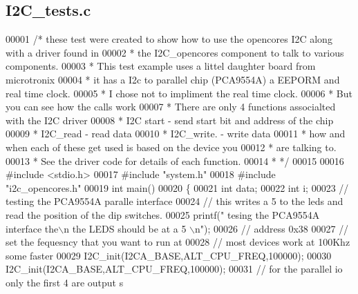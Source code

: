 \subsection{I2\+C\+\_\+tests.\+c}
\label{I2C__tests_8c_source}

\begin{DoxyCode}
00001 \textcolor{comment}{/* these test were created to show how to use the opencores I2C along with a driver found in}
00002 \textcolor{comment}{ * the I2C\_opencores component to talk to various components. }
00003 \textcolor{comment}{ * This test example uses a littel daughter board from microtronix}
00004 \textcolor{comment}{ * it has a I2c to parallel chip (PCA9554A) a EEPORM and real time clock. }
00005 \textcolor{comment}{ * I chose not to impliment the real time clock. }
00006 \textcolor{comment}{ * But you can see how the calls work}
00007 \textcolor{comment}{ * There are only 4 functions associalted with the I2C driver}
00008 \textcolor{comment}{ * I2C start  -  send start bit and address of the chip}
00009 \textcolor{comment}{ * I2C\_read - read data}
00010 \textcolor{comment}{ * I2C\_write. - write data}
00011 \textcolor{comment}{ * how and when each of these get used is based on the device you}
00012 \textcolor{comment}{ * are talking to. }
00013 \textcolor{comment}{ * See the driver code for details of each function. }
00014 \textcolor{comment}{ * */}
00015 
00016 \textcolor{preprocessor}{#include <stdio.h>}
00017 \textcolor{preprocessor}{#include "system.h"}
00018 \textcolor{preprocessor}{#include "i2c\_opencores.h"}
00019 \textcolor{keywordtype}{int} main()
00020 \{
00021     \textcolor{keywordtype}{int} data;
00022     \textcolor{keywordtype}{int} i;
00023     \textcolor{comment}{// testing the PCA9554A paralle interface}
00024     \textcolor{comment}{// this writes a 5 to the leds and read the position of the dip switches.}
00025  printf(\textcolor{stringliteral}{" tesing the PCA9554A interface the\(\backslash\)n the LEDS should be at a 5 \(\backslash\)n"});  
00026  \textcolor{comment}{// address 0x38 }
00027  \textcolor{comment}{// set the fequesncy that you want to run at }
00028  \textcolor{comment}{// most devices work at 100Khz  some faster}
00029  I2C_init(I2CA\_BASE,ALT_CPU_FREQ,100000);
00030  I2C_init(I2CA\_BASE,ALT_CPU_FREQ,100000);
00031  \textcolor{comment}{// for the parallel io only the first 4 are output s}

\end{DoxyCode}
